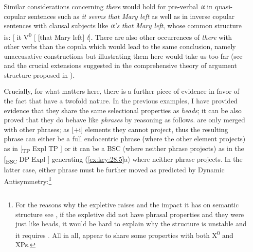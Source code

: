\documentclass[output=paper]{langsci/langscibook}
\begin{document}
Similar considerations concerning \emph{there} would hold for pre-verbal
\emph{it} in quasi-copular sentences such as \emph{it seems that Mary left} as
well as in inverse copular sentences with clausal subjects like \emph{it's that
Mary left}, whose common structure is: [ it V\textsuperscript{0} [ [that Mary
left] \emph{t}]. There are also other occurrences of \emph{there} with other
verbs than the copula which would lead to the same conclusion, namely
unaccusative constructions but illustrating them here would take us too far
(see \citealt{Moro1997} and the crucial extensions suggested in the
comprehensive theory of argument structure proposed in
\citealt{HaleKeyser2002}).

Crucially, for what matters here, there is a further piece of evidence in favor
of the fact that  have a twofold nature. In the previous examples, I
have provided evidence that they share the same selectional properties as
\emph{heads}; it can be also proved that they do behave like \emph{phrases} by
reasoning as follows.  are only merged with other phrases; as [+i]
elements they cannot project, thus the resulting phrase can either be a full
endocentric phrase (where the other element projects) as in [\textsubscript{TP}
Expl TP ] or it can be a \gls{BSC} (where neither phrase projects) as in the
[\textsubscript{BSC} DP Expl ] generating (\ref{ex:key:28.5}a) where neither
phrase projects. In the latter case, either phrase must be further moved as
predicted by Dynamic Antisymmetry\@:\footnote{For the reasons why the expletive
    raises and the impact it has on semantic structure see
    \citet[Ch.\ 3]{Moro1997},
    \citet{Moro2000,Moro2009,Chomsky2013,Chomsky2017,ChoGalOtt2019,Rizzi2015,Rizzi2016}
    if the expletive did not have phrasal properties and they were just like
    heads, it would be hard to explain why the structure is unstable and it
requires . All in all,  appear to share some properties with
both X\textsuperscript{0} and XPs.}
\end{document}
